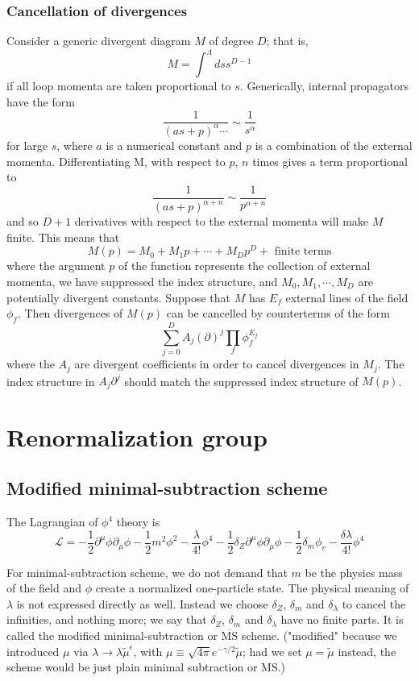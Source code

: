 \subsubsection{Cancellation of divergences}
Consider a generic divergent diagram $M$ of degree $D$; that is,
\[M = \int^{\Lambda} ds s^{D-1}\]
if all loop momenta are taken proportional to $s$. Generically, internal propagators have the form
\[\frac{1}{(as+p)^{\alpha}\cdots} \sim \frac{1}{s^{\alpha}}\]
for large $s$, where $a$ is a numerical constant and $p$ is a combination of the external momenta. Differentiating M,
with respect to $p$, $n$ times gives a term proportional to
\[\frac{1}{(as+p)^{\alpha+n}} \sim \frac{1}{p^{\alpha + n}} \]
and so $D+1$ derivatives with respect to the external momenta will make $M$ finite. This means that
\[M(p) = M_0 + M_1 p + \cdots + M_D p^D + \mbox{ finite terms}\]
where the argument $p$ of the function represents the collection of external momenta, we have suppressed the index structure, and $M_0,M_1,\cdots,M_D$ are potentially divergent constants. Suppose that $M$ has $E_f$ external lines of the field $\phi_f$. Then divergences of $M(p)$ can be cancelled by counterterms of the form
\[\sum_{j=0}^D A_j (\partial)^j \prod_f \phi_f^{E_f}\]
where the $A_j$ are divergent coefficients in order to cancel divergences in $M_j$. The index structure in $A_j \partial^j$ should
match the suppressed index structure of $M(p)$.

\section{Renormalization group}
\subsection{Modified minimal-subtraction scheme}
The Lagrangian of $\phi^4$ theory is
\[\mathcal{L} = -\frac{1}{2} \partial^{\mu} \phi \partial_{\mu} \phi -\frac{1}{2}m^2 \phi^2 - \frac{\lambda}{4!}\phi^4 -\frac{1}{2} \delta_Z \partial^{\mu} \phi \partial_{\mu} \phi -\frac{1}{2}\delta_m \phi_r - \frac{\delta \lambda}{4!}\phi^4\]

For minimal-subtraction scheme, we do not demand that $m$ be the physics mass of the field and $\phi$  create a normalized one-particle state. The physical meaning of $\lambda$ is not expressed directly as well. Instead we choose $\delta_Z$, $\delta_m$ and $\delta_{\lambda}$ to cancel the infinities, and nothing more;
we say that $\delta_Z$, $\delta_m$ and $\delta_{\lambda}$ have no finite parts. It is called the modified minimal-subtraction or $\mathrm{\overline{MS}}$ scheme. ("modified" because we introduced $\mu$ via  $\lambda \to \lambda \tilde{\mu}^{\epsilon}$, with $\mu \equiv  \sqrt{4\pi} e^{-\gamma/2} \tilde{\mu}$; had we set $\mu = \tilde{\mu}$ instead, the scheme would be just plain minimal subtraction or MS.)

